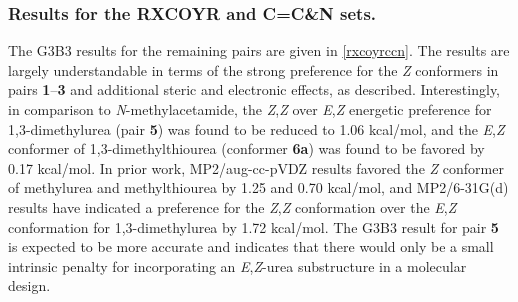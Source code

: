 \documentclass[12pt]{report}
\begin{document}
\subsubsection{Results for the RXCOYR and C=C\&N sets.}

The G3B3 results for the remaining pairs are given in \cref{rxcoyrccn}. The results are largely understandable in terms of the strong preference for the \textit{Z} conformers in pairs \textbf{1}--\textbf{3} and additional steric and electronic effects, as described. Interestingly, in comparison to \textit{N}-methylacetamide, the \textit{Z},\textit{Z} over \textit{E},\textit{Z} energetic preference for 1,3-dimethylurea (pair \textbf{5}) was found to be reduced to 1.06 kcal/mol, and the \textit{E},\textit{Z} conformer of 1,3-dimethylthiourea (conformer \textbf{6a}) was found to be favored by 0.17 kcal/mol. In prior work, MP2/aug-cc-pVDZ results favored the \textit{Z} conformer of methylurea and methylthiourea by 1.25 and 0.70 kcal/mol,\cite{bry,bry2} and MP2/6-31G(d) results have indicated a preference for the \textit{Z},\textit{Z} conformation over the \textit{E},\textit{Z} conformation for 1,3-dimethylurea by 1.72 kcal/mol.\cite{strassner} The G3B3 result for pair \textbf{5} is expected to be more accurate and indicates that there would only be a small intrinsic penalty for incorporating an \textit{E},\textit{Z}-urea substructure in a molecular design.
\end{document}
